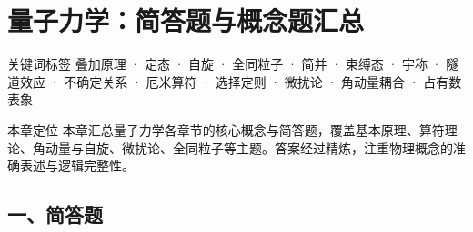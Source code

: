 \section{量子力学：简答题与概念题汇总}
\label{sec:qm-short-questions}

\begin{tipbox}{关键词标签}
叠加原理 · 定态 · 自旋 · 全同粒子 · 简并 · 束缚态 · 宇称 · 隧道效应 · 不确定关系 · 厄米算符 · 选择定则 · 微扰论 · 角动量耦合 · 占有数表象
\end{tipbox}

\begin{insightbox}{本章定位}
本章汇总量子力学各章节的核心概念与简答题，覆盖基本原理、算符理论、角动量与自旋、微扰论、全同粒子等主题。答案经过精炼，注重物理概念的准确表述与逻辑完整性。
\end{insightbox}

\vspace{0.5em}

\subsection{一、简答题}

